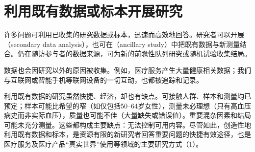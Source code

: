 \chapter{利用既有数据或标本开展研究}
许多问题可利用已收集的研究数据或标本，迅速而高效地回答。研究者可以开展（secondary data analysis），也可在（ancillary study）中把既有数据与新测量结合。仍在随访参与者的数据来源，可为新的前瞻性队列研究或随机试验收集结局。

数据也会因研究以外的原因被收集。例如，医疗服务产生大量健康相关数据；我们与互联网或智能手机等联网设备的一切互动，也都被追踪和记录。

利用既有数据的研究虽然快捷、经济，却也有缺点。可接触人群、样本和测量均已预定；样本可能比希望的窄（如仅包括50--64岁女性），测量未必理想（只有高血压病史而非实际血压），质量也可能不佳（大量缺失或错误值）。重要混杂因素和结局可能未充分测量。这些都构成主要缺点：无法控制可用内容。尽管如此，创造性地利用既有数据和标本，是资源有限的新研究者回答重要问题的快捷有效途径，也是医疗服务及医疗产品“真实世界”使用等领域的主要研究方式（1）。

